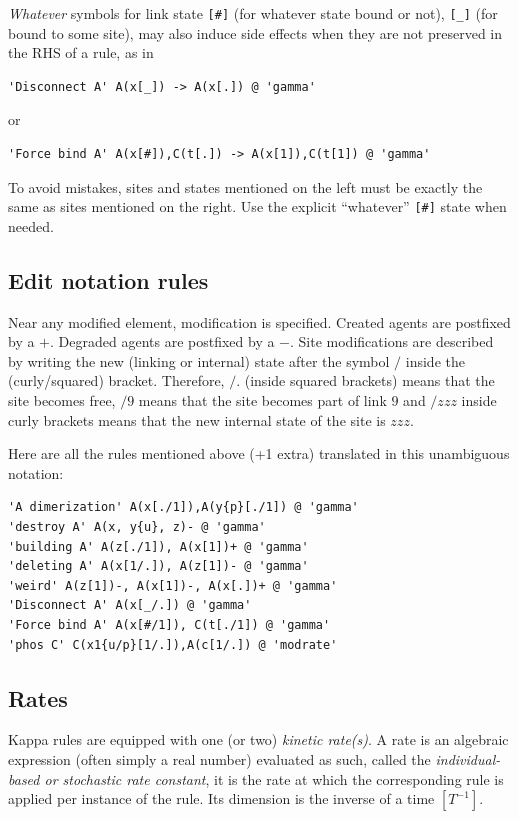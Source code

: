 \documentclass[11pt]{book}
\def\ttt#1{\texttt{#1}}
\begin{document}
\emph{Whatever} symbols for link state \ttt{[\#]} (for whatever state
bound or not), \ttt{[\_]} (for bound to some site), may also induce
side effects when they are not preserved in the RHS of a rule, as in
\begin{lstlisting}[language=kappa]
'Disconnect A' A(x[_]) -> A(x[.]) @ 'gamma'
\end{lstlisting}
or
\begin{lstlisting}[language=kappa]
'Force bind A' A(x[#]),C(t[.]) -> A(x[1]),C(t[1]) @ 'gamma'
\end{lstlisting}
To avoid mistakes, sites and states mentioned on the left must be
exactly the same as sites mentioned on the right. Use the explicit
``whatever'' \ttt{[\#]} state when needed.

\subsection{Edit notation rules}

Near any modified element, modification is specified. Created agents
are postfixed by a $+$. Degraded agents are postfixed by a $-$. Site
modifications are described by writing the new (linking or internal)
state after the symbol $/$ inside the (curly/squared)
bracket. Therefore, $/.$ (inside squared brackets) means that the site
becomes free, $/9$ means that the site becomes part of link $9$ and
$/zzz$ inside curly brackets means that the new internal state of the
site is $zzz$.

Here are all the rules mentioned above (+1 extra) translated in this
unambiguous notation:
\begin{lstlisting}[language=kappa]
'A dimerization' A(x[./1]),A(y{p}[./1]) @ 'gamma'
'destroy A' A(x, y{u}, z)- @ 'gamma'
'building A' A(z[./1]), A(x[1])+ @ 'gamma'
'deleting A' A(x[1/.]), A(z[1])- @ 'gamma'
'weird' A(z[1])-, A(x[1])-, A(x[.])+ @ 'gamma'
'Disconnect A' A(x[_/.]) @ 'gamma'
'Force bind A' A(x[#/1]), C(t[./1]) @ 'gamma'
'phos C' C(x1{u/p}[1/.]),A(c[1/.]) @ 'modrate'
\end{lstlisting}

\subsection{Rates}\label{sec:kinetics}
Kappa rules are equipped with one (or two) \emph{kinetic
  rate(s)}. A rate is an algebraic
expression (often simply a real
number) evaluated as such, called the \emph{individual-based or
  stochastic rate constant}, it is the rate at which the corresponding rule is applied
per instance of the rule. Its dimension is the inverse of a time
$[T^{-1}]$.
\end{document}
